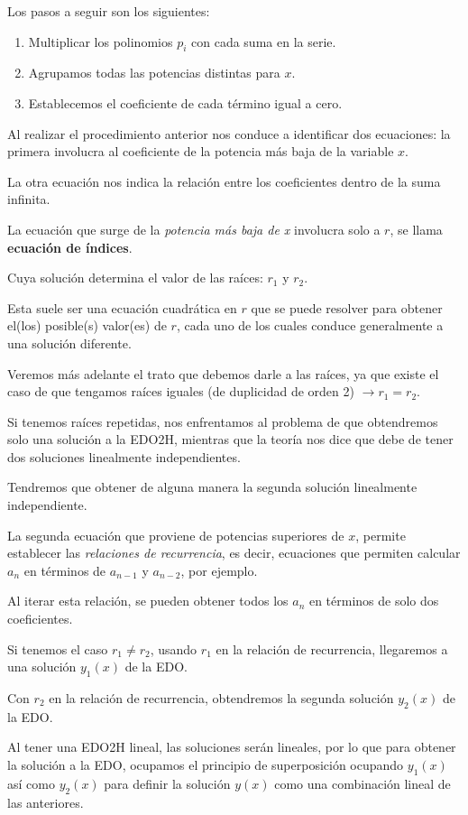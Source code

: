 Los pasos a seguir son los siguientes:
\begin{enumerate}
\item Multiplicar los polinomios $p_{i}$ con cada suma en la serie.
\item Agrupamos todas las potencias distintas para $x$.
\item Establecemos el coeficiente de cada término igual a cero.
\end{enumerate}

Al realizar el procedimiento anterior nos conduce a identificar dos ecuaciones: la primera involucra al  coeficiente de la potencia más baja de la variable $x$.
\par
La otra ecuación nos indica la relación entre los coeficientes dentro de la suma infinita.
\par
La ecuación que surge de la \emph{potencia más baja de x} involucra solo a $r$, se llama \textbf{ecuación de índices}.
\par
Cuya solución determina el valor de las raíces: $r_{1}$ y $r_{2}$.
\par
Esta suele ser una ecuación cuadrática en $r$ que se puede resolver para obtener el(los) posible(s) valor(es) de $r$, cada uno de los cuales conduce generalmente a una solución diferente.
\par
Veremos más adelante el trato que debemos darle a las raíces, ya que existe el caso de que tengamos raíces iguales (de duplicidad de orden 2) $\to r_{1} = r_{2}$.
\par
Si tenemos raíces repetidas, nos enfrentamos al problema de que obtendremos solo una solución a la EDO2H, mientras que la teoría nos dice que debe de tener dos soluciones linealmente independientes.
\par
Tendremos que obtener de alguna manera la segunda solución linealmente independiente.
\par
La segunda ecuación que proviene de potencias superiores de $x$, permite establecer las \emph{relaciones de recurrencia}, es decir, ecuaciones que permiten calcular $a_{n}$ en términos de $a_{n-1}$ y $a_{n-2}$, por ejemplo.
\par
Al iterar esta relación, se pueden obtener todos los $a_{n}$ en términos de solo dos coeficientes.
\par
Si tenemos el caso $r_{1} \neq r_{2}$, usando $r_{1}$ en la relación de recurrencia, llegaremos a una solución $y_{1}(x)$ de la EDO.
\par
Con $r_{2}$ en la relación de recurrencia, obtendremos la segunda solución $y_{2}(x)$ de la EDO.
\par
Al tener una EDO2H lineal, las soluciones serán lineales, por lo que para obtener la solución a la EDO, ocupamos el principio de superposición ocupando $y_{1}(x)$ así como $y_{2}(x)$ para definir la solución $y(x)$ como una combinación lineal de las anteriores.

